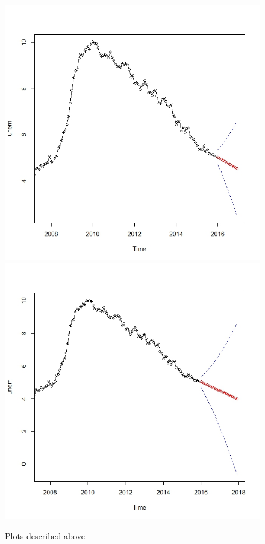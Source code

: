 \documentclass[twoside,twocolumn]{article}
\begin{document}
  \begin{figure}[htb]
    	\centering
     	\caption{Plots described above}
     	\includegraphics[width=.9\linewidth]{images/fore2}
     	\includegraphics[width=.9\linewidth]{images/fore3}

\end{figure}
\end{document}

